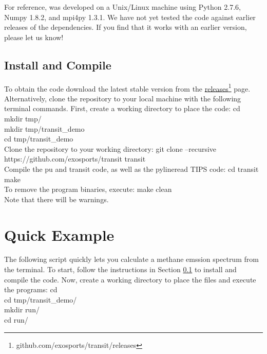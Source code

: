 \documentclass[letterpaper, 12pt]{article}
\begin{document}
For reference, {\transit} was developed on a Unix/Linux machine using Python
2.7.6, Numpy 1.8.2, and mpi4py 1.3.1. We have not yet tested the code against
earlier releases of the dependencies. If you find that it works with an earlier
version, please let us know!

\subsection{Install and Compile}
\label{sec:compile}

To obtain the {\transit} code download the latest stable version from
the \href{https://github.com/exosports/transit/releases}
{releases}\footnote{github.com/exosports/transit/releases} page.
Alternatively, clone the repository to your local machine with the
following terminal commands.  First, create a working directory to
place the code: \newline
{\tttb cd} \\
{\tttb mkdir tmp/} \\
{\tttb mkdir tmp/transit\_demo} \\
{\tttb cd tmp/transit\_demo} \\

\noindent Clone the repository to your working directory: \newline
{\tttb git clone --recursive https://github.com/exosports/transit transit} \\

\noindent Compile the {\tttm pu} and {\tttm transit} code, as well as
the {\tttm pylineread} TIPS code: \newline
{\tttb cd transit} \\
{\tttb make} \\

\noindent To remove the program binaries, execute: \newline
{\tttb make clean} \\

\noindent Note that there will be warnings.

\newpage

\section{Quick Example}
\label{sec:quick-example}

The following script quickly lets you calculate a methane emssion
spectrum from the terminal.  To start, follow the instructions in
Section \ref{sec:compile} to install and compile the code.  Now,
create a working directory to place the files and execute the
programs: \newline
{\tttb cd} \\
{\tttb cd tmp/transit\_demo/} \\
{\tttb mkdir run/} \\
{\tttb cd run/} \\
\end{document}
